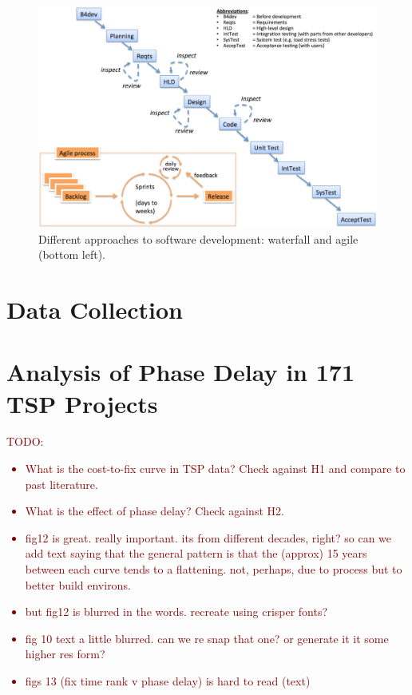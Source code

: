 \documentclass{sig-alternate}
\newcommand{\todo}[1]{\textcolor{Maroon}{TODO: #1}}
\newcommand{\bi}{\begin{itemize}[leftmargin=0.4cm]}
\newcommand{\ei}{\end{itemize}}
\begin{document}







%

 
\begin{figure}[!t]
\begin{center}
\includegraphics[width=6in]{waterfall3.png}
\end{center}
\caption{Different approaches to software development:  waterfall and agile (bottom left).}
\label{fig:waterfall}
\end{figure}

\section{Data Collection}












\section{Analysis of Phase Delay in 171 TSP Projects}

\todo{
\bi
    \item What is the cost-to-fix curve in TSP data? Check against H1 and compare to past literature.
    \item What is the effect of phase delay? Check against H2.
    \item fig12 is great. really important. its from  different decades, right?  so can we add text saying that the general pattern is that the (approx) 15 years between each curve tends to a flattening. not, perhaps, due to process but to better build environs.
    \item but fig12 is blurred in the words. recreate using crisper fonts?
    \item fig 10 text a little blurred. can we re snap that one? or generate it it some higher res form?
    \item figs 13 (fix time rank v phase delay) is hard to read (text)
\ei
}
\end{document}
